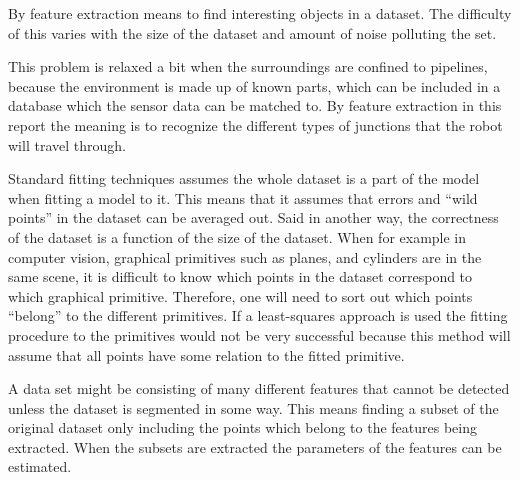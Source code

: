 By feature extraction means to find interesting objects in a dataset. The difficulty of
this varies with the size of the dataset and amount of noise polluting the set.

This problem is relaxed a bit when the surroundings are confined to pipelines, because the
environment is made up of known parts, which can be included in a database which the
sensor data can be matched to. 
By feature extraction in this report the meaning is to recognize the different types of junctions
that the robot will travel through. 

Standard fitting techniques assumes the whole dataset is a part of the model when fitting
a model to it. This
means that it assumes that errors and ``wild points'' in the dataset can be averaged out.
Said in another way, the correctness of the dataset is a function of the size of the
dataset. When for example in computer vision, graphical primitives such as planes, and
cylinders are in the same scene, it is difficult to know which points in the dataset
correspond to which graphical primitive. Therefore, one will need to sort out which points
``belong'' to the different primitives. If a least-squares approach is used the fitting
procedure to the primitives would not be very successful because this method will assume
that all points have some relation to the fitted primitive. \cite{ransac}

A data set might be consisting of many different features that cannot be detected unless
the dataset is segmented in some way. This means finding a subset of the original dataset
only including the points which belong to the features being extracted. 
When the subsets are extracted the parameters of the features can be estimated. 


